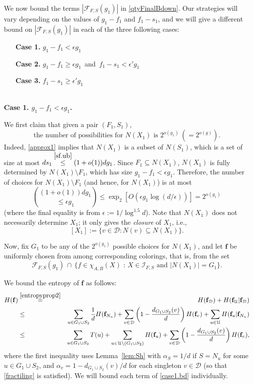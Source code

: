\documentclass{amsart}
\theoremstyle{definition}
\newcommand{\cD}{\mathcal{D} }
\newcommand{\cF}{\mathcal{F} }
\newcommand{\cU}{\mathcal{U} }
\newcommand{\bbf}{\mathbf{f}}
\newcommand{\beq}[1]{\begin{equation}\label{#1}}
\newcommand{\enq}[0]{\end{equation}}
\newcommand{\eps}{\epsilon}
\newcommand{\sub}[0]{\subseteq}
\newcommand{\0}[0]{\emptyset}
\begin{document}
We now bound the terms $|\cF_{F, S}(g_1)|$ in \eqref{qtyFinalBdown}. Our strategies will vary depending on the values of $g_1 - f_1$ and $f_1 - s_1$, and we will give a different bound on $|\cF_{F, S}(g_1)|$ in each of the three following cases:
\begin{itemize}
	\item[\textbf{Case 1.}] $g_1-f_1<\eps g_1$
	\item[\textbf{Case 2.}] $g_1-f_1 \ge \eps g_1$\, and\, $f_1-s_1 < \eps' g_1$
	\item[\textbf{Case 3.}]	$f_1-s_1 \ge \eps' g_1$
\end{itemize}

\mbox{}\\\noindent\textbf{Case 1. $g_1-f_1<\eps g_1$.} 

We first claim that given a pair $(F_1,S_1)$, 
\beq{NX.cost} \mbox{the number of possibilities for $N(X_1)$  is $2^{o(g_1)} ~ (=2^{o(g)})$.} \enq
 Indeed, \eqref{approx1} implies that $N(X_1)$ is a subset of $N(S_1)$, which is a set of size at most $ds_1 \stackrel{\eqref{sf.ub}}{\le} (1+o(1))dg_1$. Since $F_1 \sub N(X_1)$, $N(X_1)$ is fully determined by $N(X_1) \setminus F_1$, which has size $g_1-f_1<\eps g_1$. Therefore, the number of choices for $N(X_1) \setminus F_1$ (and hence, for $N(X_1)$) is at most 
\[{(1+o(1))dg_1 \choose \le \eps g_1}\le \exp_2[O(\eps g_1\log(d/\eps))]
{=}2^{o(g_1)}\]
(where the final equality is from $\eps:=1/\log^{1.5} d$). Note that $N(X_1)$ does not necessarily determine $X_1$; it only gives the \textit{closure} of $X_1$, i.e., \[[X_1]:=\{v \in \cD:N(v) \sub N(X_1)\}.\] 

Now, fix $G_1$ to be any of the $2^{o(g_1)}$ possible choices for $N(X_1)$, and let $\bbf$ be uniformly chosen from among corresponding colorings, that is, from the set
\[\cF_{F, S}(g_1)\,\cap\, \{\mbox{$f \in \chi_{A,B}(X)$ :  $X\in\mathcal{I}_{F, S}$ and $|N(X_1)|=G_1$}\}.\]  

We bound the entropy of $\mathbf{f}$ as follows:
\begin{eqnarray}
H(\bbf)&\stackrel{\eqref{entropyprop2}}{=}& H(\bbf_\cD)+H(\bbf_\cU|\bbf_\cD)\nonumber\\
&\le & \sum_{u \in G_1 \cup S_2}\frac1dH(\bbf_{N_u}) + \sum_{v \in \cD}\left(1-\frac{d_{G_1 \cup S_2}(v)}{d}\right)H(\bbf_v)+\sum_{u\in\cU}H(\bbf_u|\bbf_{N_u})\nonumber\\
&\le & \sum_{u \in G_1 \cup S_2}T(u)+\sum_{u \in \cU \setminus (G_1 \cup S_2)} H(\bbf_u)+\sum_{v \in \cD}\left(1-\frac{d_{G_1 \cup S_2}(v)}{d}\right)H(\bbf_v),\label{case1.bd}
\end{eqnarray}
where the first inequality uses Lemma~\ref{lem:Sh} with $\alpha_S=1/d$ if $S=N_u$ for some $u \in G_1 \cup S_2$, and $\alpha_v=1-d_{G_1 \cup S_2}(v)/d$ for each singleton $v \in \cD$ (so that \eqref{fractiling} is satisfied).
We will bound each term of \eqref{case1.bd} individually.\\
\end{document}
